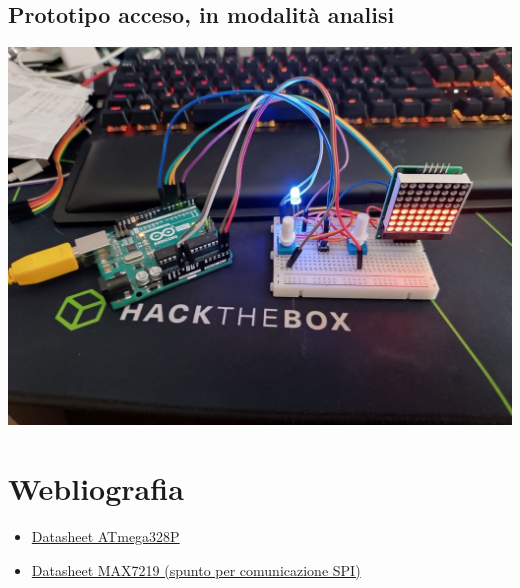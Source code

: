 \documentclass{article}
\begin{document}
\subsection{Prototipo acceso, in modalità analisi}
\includegraphics[scale=.25]{protOnRec.jpg}

\section{Webliografia}
\begin{itemize}
    \item \href{https://ww1.microchip.com/downloads/en/DeviceDoc/Atmel-7810-Automotive-Microcontrollers-ATmega328P_Datasheet.pdf}{Datasheet ATmega328P}
    \item \href{https://www.farnell.com/datasheets/29075.pdf}{Datasheet MAX7219 (spunto per comunicazione SPI)}
\end{itemize}
\end{document}

